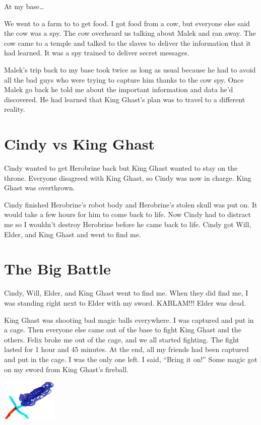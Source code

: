 \documentclass[12pt,oneside]{krantz}
\begin{document}
At my base\ldots{}

We went to a farm to to get food. I got food from a cow, but everyone
else said the cow was a spy. The cow overheard us talking about Malek
and ran away. The cow came to a temple and talked to the slaves to
deliver the information that it had learned. It was a spy trained to
deliver secret messages.

Malek's trip back to my base took twice as long as usual because he had
to avoid all the bad guys who were trying to capture him thanks to the
cow spy. Once Malek go back he told me about the important information
and data he'd discovered. He had learned that King Ghast's plan was to
travel to a different reality.

\hypertarget{cindy-vs-king-ghast}{%
\chapter{Cindy vs King Ghast}\label{cindy-vs-king-ghast}}

Cindy wanted to get Herobrine back but King Ghast wanted to stay on the
throne. Everyone disagreed with King Ghast, so Cindy was now in charge.
King Ghast was overthrown.

Cindy finished Herobrine's robot body and Herobrine's stolen skull was
put on. It would take a few hours for him to come back to life. Now
Cindy had to distract me so I wouldn't destroy Herobrine before he came
back to life. Cindy got Will, Elder, and King Ghast and went to find me.

\hypertarget{the-big-battle}{%
\chapter{The Big Battle}\label{the-big-battle}}

Cindy, Will, Elder, and King Ghast went to find me. When they did find
me, I was standing right next to Elder with my sword. KABLAM!!! Elder
was dead.

King Ghast was shooting bad magic balls everywhere. I was captured and
put in a cage. Then everyone else came out of the base to fight King
Ghast and the others. Felix broke me out of the cage, and we all started
fighting. The fight lasted for 1 hour and 45 minutes. At the end, all my
friends had been captured and put in the cage. I was the only one left.
I said, ``Bring it on!'' Some magic got on my sword from King Ghast's
fireball.

\includegraphics[width=1.04167in,height=\textheight]{img/king-ghast/13-sword.jpg}
\end{document}
